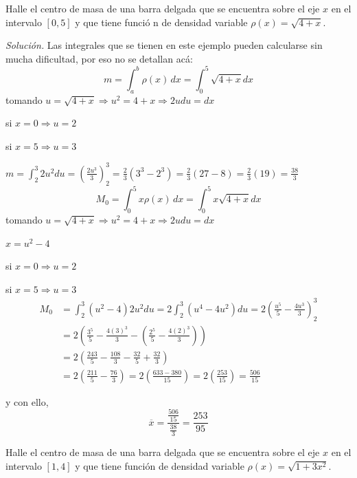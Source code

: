 \begin{ejemplo}
Halle el centro de masa de una barra delgada que se encuentra
sobre el eje $x$ en el intervalo $\left[ 0,5\right] $ y que tiene funció%
n de densidad variable $\rho \left( x\right) =\sqrt{4+x}$.
\end{ejemplo}

\emph{Solución.} Las integrales que se tienen en este ejemplo pueden calcularse sin mucha dificultad, por eso no se detallan acá:
\[
m=\int_{a}^{b}\rho \left( x\right)\,dx=\int_{0}^{5}\sqrt{4+x}dx
\]
tomando $u=\sqrt{4+x}\Rightarrow u^{2}=4+x\Rightarrow 2udu=dx$

si $x=0\Rightarrow u=2$

si $x=5\Rightarrow u=3$

$m=\int_{2}^{3}2u^{2}du=\left( \frac{2u^{3}}{3}\right) _{2}^{3}=\frac{2}{3}%
\left( 3^{3}-2^{3}\right) =\frac{2}{3}\left( 27-8\right) =\frac{2}{3}\left(
19\right) =\frac{38}{3}$
\[
M_{0}=\int_{0}^{5}x\rho \left( x\right)\,dx=\int_{0}^{5}x\sqrt{4+x}dx
\]
tomando $u=\sqrt{4+x}\Rightarrow u^{2}=4+x\Rightarrow 2udu=dx$

$x=u^{2}-4$

si $x=0\Rightarrow u=2$

si $x=5\Rightarrow u=3$
\begin{align*}
M_{0}&=\int_{2}^{3}\left( u^{2}-4\right) 2u^{2}du=2\int_{2}^{3}\left(
u^{4}-4u^{2}\right) du=2\left( \frac{u^{5}}{5}-\frac{4u^{3}}{3}\right)
_{2}^{3}\\
&=2\left( \frac{3^{5}}{5}-\frac{4\left( 3\right) ^{3}}{3}-\left( \frac{2^{5}}{5}-\frac{4\left( 2\right) ^{3}}{3}\right) \right)\\
&=2\left( \frac{243}{5}-\frac{108}{3}-\frac{32}{5}+\frac{32}{3}\right) \\
&=2\left( \frac{211}{5}-\frac{76}{3}\right)=2\left( \frac{633-380}{15}\right) =2\left( \frac{253}{15}\right) =\frac{506}{15}
\end{align*}

y con ello,
\[
\overline{x}=\frac{\frac{506}{15}}{\frac{38}{3}}=\allowbreak \frac{253}{95}
\]

\begin{ejemplo}
Halle el centro de masa de una barra delgada que se encuentra sobre el eje $x$ en el intervalo $\left[ 1,4\right] $ y que tiene función
de densidad variable $\rho \left( x\right) =\sqrt{1+3x^{2}}$.
\end{ejemplo}

